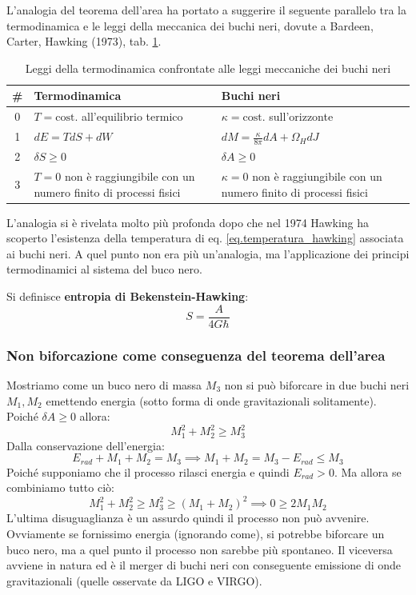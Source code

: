 L'analogia del teorema dell'area ha portato a suggerire il seguente parallelo tra la termodinamica e le leggi della meccanica dei buchi neri, dovute a Bardeen, Carter, Hawking (1973), tab. \ref{tab.termo_buchineri}.
\begin{table}[h]
    \centering
    \begin{tabular}{ c p{5cm} p{5cm} }
    \hline
    \# & Termodinamica & Buchi neri \\
    \hline
    0&  $T = \textrm{cost.}$ all'equilibrio termico & $\kappa = \textrm{cost.} $ sull'orizzonte \\
    1& $dE = TdS + dW$ & $dM = \frac{\kappa}{8\pi}dA + \Omega_H dJ$\\
    2& $\delta S \geq 0$  & $\delta A \geq 0$\\
    3& $T=0$ non è raggiungibile con un numero finito di processi fisici & $\kappa = 0$ non è raggiungibile con un numero finito di processi fisici\\
    \hline
    \end{tabular}
    \caption{Leggi della termodinamica confrontate alle leggi meccaniche dei buchi neri}
    \label{tab.termo_buchineri}
\end{table}
L'analogia si è rivelata molto più profonda dopo che nel 1974 Hawking ha scoperto l'esistenza della temperatura di eq. \ref{eq.temperatura_hawking} associata ai buchi neri. A quel punto non era più un'analogia, ma l'applicazione dei principi termodinamici al sistema del buco nero.

Si definisce \textbf{entropia di Bekenstein-Hawking}:
\begin{equation}
    S = \frac{A}{4G\hbar}
    \label{eq.entropia_beken_hawking}
\end{equation}
\subsubsection{Non biforcazione come conseguenza del teorema dell'area}
Mostriamo come un buco nero di massa $M_3$ non si può biforcare in due buchi neri $M_1, M_2$ emettendo energia (sotto forma di onde gravitazionali solitamente). Poiché $\delta A \geq 0$ allora:
\begin{equation*}
    M_1^2 + M_2^2 \geq M_3^2
\end{equation*}
Dalla conservazione dell'energia:
\begin{equation*}
    E_{rad} + M_1 + M_2 = M_3 \implies M_1+M_2 = M_3 - E_{rad} \leq M_3
\end{equation*}
Poiché supponiamo che il processo rilasci energia e quindi $E_{rad}>0$. Ma allora se combiniamo tutto ciò:
\begin{equation*}
    M_1^2 +M_2^2 \geq M_3^2 \geq (M_1+M_2)^2 \implies 0 \geq 2M_1M_2
\end{equation*}
L'ultima disuguaglianza è un assurdo quindi il processo non può avvenire. Ovviamente se fornissimo energia (ignorando come), si potrebbe biforcare un buco nero, ma a quel punto il processo non sarebbe più spontaneo. Il viceversa avviene in natura ed è il merger di buchi neri con conseguente emissione di onde gravitazionali (quelle osservate da LIGO e VIRGO).

